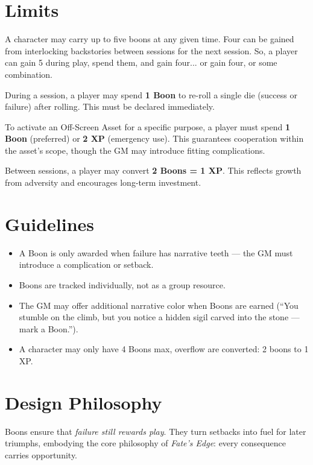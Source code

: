 \documentclass[12pt]{article}
\begin{document}
\section*{Limits}
A character may carry up to five boons at any given time. Four can be gained from interlocking backstories between sessions for the next session. So, a player can gain 5 during play, spend them, and gain four... or gain four, or some combination.

\begin{description}[leftmargin=2cm]
  \item[Re-roll Opportunity:] During a session, a player may spend \textbf{1 Boon} to re-roll a single die (success or failure) after rolling. This must be declared immediately.
  \item[Asset Activation:] To activate an Off-Screen Asset for a specific purpose, a player must spend \textbf{1 Boon} (preferred) or \textbf{2 XP} (emergency use). This guarantees cooperation within the asset’s scope, though the GM may introduce fitting complications.
  \item[Experience Conversion:] Between sessions, a player may convert \textbf{2 Boons = 1 XP}. This reflects growth from adversity and encourages long-term investment.
\end{description}

\section*{Guidelines}
\begin{itemize}
  \item A Boon is only awarded when failure has narrative teeth — the GM must introduce a complication or setback.
  \item Boons are tracked individually, not as a group resource.
  \item The GM may offer additional narrative color when Boons are earned (“You stumble on the climb, but you notice a hidden sigil carved into the stone — mark a Boon.”).
  \item A character may only have 4 Boons max, overflow are converted: 2 boons to 1 XP.
\end{itemize}

\section*{Design Philosophy}
Boons ensure that \emph{failure still rewards play}. They turn setbacks into fuel for later triumphs, embodying the core philosophy of \textit{Fate’s Edge}: every consequence carries opportunity.  
\end{document}
